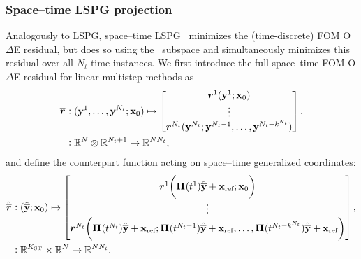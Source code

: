 \documentclass[3p,computermodern,10pt]{elsarticle}
\begin{document}
\subsubsection{Space--time LSPG projection} 
Analogously to LSPG, space--time LSPG~\cite{choi_stlspg}
minimizes the (time-discrete) FOM O$\Delta$E residual, but does so
using the \spaceTimeAcronym\ subspace and simultaneously minimizes this
residual over all $N_t$ time instances.
We first introduce the full space--time FOM O$\Delta$E residual for linear
multistep methods as
\begin{align*}
\overline{\boldsymbol r}_{} & \vcentcolon (\mathbf{y}^{1}, \ldots
	,\mathbf{y}^{N_t};{{\mathbf{x}}_0}) \mapsto \begin{bmatrix}
\boldsymbol r_{}^{1}(\mathbf{y}^{1}; {{\mathbf{x}}_0}) 
\\ 
\vdots \\
\boldsymbol r_{}^{N_t}(\mathbf{y}^{N_t};\mathbf{y}^{N_t-1},\ldots,\mathbf{y}^{N_t - k^{N_t}}) \end{bmatrix} , \\
& \vcentcolon \mathbb{R}^{N} \otimes \mathbb{R}^{N_t+1} \rightarrow \mathbb{R}^{N N_t},
\end{align*}
and define the counterpart function acting on space--time generalized
coordinates:
\begin{align*}
\hat{\overline{\boldsymbol r}}_{\text{}} & \vcentcolon (\hat{\mathbf{\overline{y}}} ;{{\mathbf{x}}_0}) \mapsto \begin{bmatrix}
\boldsymbol r_{}^{1}\bigg( \boldsymbol \Pi^{}(t^1)\hat{\mathbf{\overline{y}}} + \mathbf{x}_\text{ref}; {{\mathbf{x}}_0} \bigg)
\\ 
\vdots \\
\boldsymbol r_{}^{N_t}\bigg( \boldsymbol \Pi^{}(t^{N_t})\hat{\mathbf{\overline{y}}} + \mathbf{x}_\text{ref}; \boldsymbol \Pi^{}(t^{N_t-1})\hat{\mathbf{\overline{y}}} + \mathbf{x}_\text{ref} ,\ldots,  \boldsymbol \Pi^{}(t^{N_t-k^{N_t}})\hat{\mathbf{\overline{y}}} + \mathbf{x}_\text{ref} \bigg)  \\ 
\end{bmatrix} , \\
& \vcentcolon \mathbb{R}^{K_{\text{ST}}} \times \mathbb{R}^{N} \rightarrow \mathbb{R}^{N N_t}. 
\end{align*}
\end{document}
